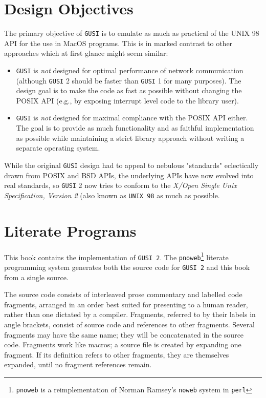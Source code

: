 \documentclass[a4paper,dvips]{book}
\begin{document}
\section{Design Objectives}

The primary objective of \texttt{GUSI} is to emulate as much as practical of the 
UNIX 98 API for the use in MacOS programs. This is in marked contrast to other
approaches which at first glance might seem similar:

\begin{itemize}
\item \texttt{GUSI} is \textit{not} designed for optimal performance of network communication
	(although \texttt{GUSI} 2 should be faster than \texttt{GUSI} 1 for many purposes). The
	design goal is to make the code as fast as possible without changing the POSIX
	API (e.g., by exposing interrupt level code to the library user).

\item \texttt{GUSI} is \textit{not} designed for maximal compliance with the POSIX API either. The
	goal is to provide as much functionality and as faithful implementation as possible
	while maintaining a strict library approach without writing a separate operating
	system. 
\end{itemize}

While the original \texttt{GUSI} design had to appeal to nebulous "standards" eclectically
drawn from POSIX and BSD APIs, the underlying APIs have now evolved into real 
standards, so \texttt{GUSI} 2 now tries to conform to the \textit{X/Open Single Unix Specification,
Version 2} (also known as \texttt{UNIX 98} as much as possible.

\section{Literate Programs}

This book contains the implementation of \texttt{GUSI 2}. The \texttt{pnoweb}\footnote{\texttt{pnoweb} is 
a reimplementation of Norman Ramsey's \texttt{noweb} system in \texttt{perl}} literate programming system
generates both the source code for \texttt{GUSI 2} and this book from a single source.

The source code consists of interleaved prose commentary and labelled code fragments, arranged in an order 
best suited for presenting to a human reader, rather than one dictated by a compiler. Fragments, referred
to by their labels in angle brackets, consist of source code and references to other fragments. Several 
fragments may have the same name; they will be concatenated in the source code. Fragments work like macros;
a source file is created by expanding one fragment. If its definition refers to other fragments, they are 
themselves expanded, until no fragment references remain. 
\end{document}
